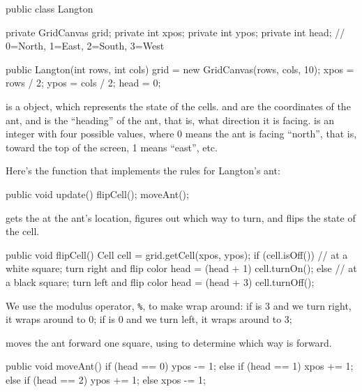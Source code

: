 \begin{code}
public class Langton {
    private GridCanvas grid;
    private int xpos;
    private int ypos;
    private int head; // 0=North, 1=East, 2=South, 3=West

    public Langton(int rows, int cols) {
        grid = new GridCanvas(rows, cols, 10);
        xpos = rows / 2;
        ypos = cols / 2;
        head = 0;
    }
}
\end{code}

 is a  object, which represents the state of the cells.
 and  are the coordinates of the ant, and  is the ``heading'' of the ant, that is, what direction it is facing.
 is an integer with four possible values, where 0 means the ant is facing ``north'', that is, toward the top of the screen, 1 means ``east'', etc.

Here's the  function that implements the rules for Langton's ant:

\begin{code}
    public void update() {
        flipCell();
        moveAnt();
    }
\end{code}

 gets the  at the ant's location, figures out which way to turn, and flips the state of the cell.

\begin{code}
    public void flipCell() {
        Cell cell = grid.getCell(xpos, ypos);
        if (cell.isOff()) {
            // at a white square; turn right and flip color
            head = (head + 1) %
            cell.turnOn();
        } else {
            // at a black square; turn left and flip color
            head = (head + 3) %
            cell.turnOff();
        }
    }
\end{code}

We use the modulus operator, \verb"%", to make  wrap around: if  is 3 and we turn right, it wraps around to 0; if  is 0 and we turn left, it wraps around to 3; 

 moves the ant forward one square, using  to determine which way is forward.

\begin{code}
    public void moveAnt() {
        if (head == 0) {
            ypos -= 1;
        } else if (head == 1) {
            xpos += 1;
        } else if (head == 2) {
            ypos += 1;
        } else {
            xpos -= 1;
        }
    }
\end{code}


